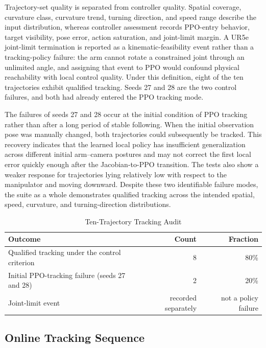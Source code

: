 \documentclass[conference]{IEEEtran}
\begin{document}
Trajectory-set quality is separated from controller quality. Spatial coverage, curvature class, curvature trend, turning direction, and speed range describe the input distribution, whereas controller assessment records PPO-entry behavior, target visibility, pose error, action saturation, and joint-limit margin. A UR5e joint-limit termination is reported as a kinematic-feasibility event rather than a tracking-policy failure: the arm cannot rotate a constrained joint through an unlimited angle, and assigning that event to PPO would confound physical reachability with local control quality. Under this definition, eight of the ten trajectories exhibit qualified tracking. Seeds 27 and 28 are the two control failures, and both had already entered the PPO tracking mode.

The failures of seeds 27 and 28 occur at the initial condition of PPO tracking rather than after a long period of stable following. When the initial observation pose was manually changed, both trajectories could subsequently be tracked. This recovery indicates that the learned local policy has insufficient generalization across different initial arm--camera postures and may not correct the first local error quickly enough after the Jacobian-to-PPO transition. The tests also show a weaker response for trajectories lying relatively low with respect to the manipulator and moving downward. Despite these two identifiable failure modes, the suite as a whole demonstrates qualified tracking across the intended spatial, speed, curvature, and turning-direction distributions.

\begin{table}[t]
\caption{Ten-Trajectory Tracking Audit}
\label{tab:tracking_outcomes}
\centering
\begin{tabular}{lrr}
\toprule
Outcome & Count & Fraction \\
\midrule
Qualified tracking under the control criterion & 8 & 80\% \\
Initial PPO-tracking failure (seeds 27 and 28) & 2 & 20\% \\
Joint-limit event & recorded separately & not a policy failure \\
\bottomrule
\end{tabular}
\end{table}

\subsection{Online Tracking Sequence}
\end{document}
